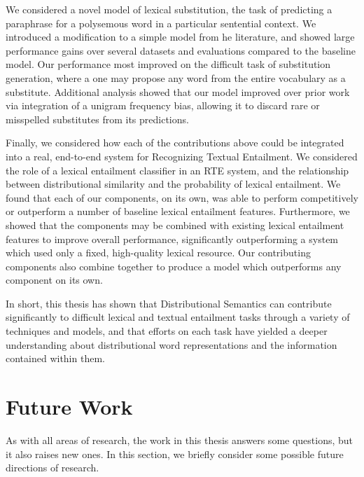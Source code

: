 We considered a novel model of lexical substitution, the task of predicting
a paraphrase for a polysemous word in a particular sentential context. We introduced
a modification to a simple model from he literature, and showed
large performance gains over several datasets and evaluations compared to the
baseline model. Our performance most improved on the difficult task of
substitution generation, where a one may propose any word from the entire
vocabulary as a substitute. Additional analysis showed that our model improved
over prior work via integration of a unigram frequency bias, allowing
it to discard rare or misspelled substitutes from its predictions.

Finally, we considered how each of the contributions above could be integrated
into a real, end-to-end system for Recognizing Textual Entailment. We considered
the role of a lexical entailment classifier in an RTE system, and the
relationship between distributional similarity and the probability of lexical
entailment. We found that each of our components, on its own, was able to
perform competitively or outperform a number of baseline lexical entailment
features. Furthermore, we showed that the components may be combined with
existing lexical entailment features to improve overall performance,
significantly outperforming a system which used only a fixed, high-quality
lexical resource. Our contributing components also combine together to produce
a model which outperforms any component on its own.

In short, this thesis has shown that Distributional Semantics can contribute
significantly to difficult lexical and textual entailment tasks through a
variety of techniques and models, and that efforts on each task have yielded
a deeper understanding about distributional word representations and the
information contained within them.


\section{Future Work}

As with all areas of research, the work in this thesis answers some questions,
but it also raises new ones. In this section, we briefly consider some possible
future directions of research.

